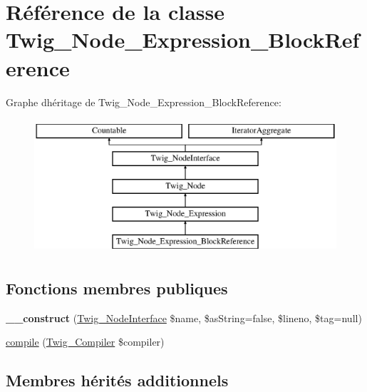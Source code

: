 \hypertarget{class_twig___node___expression___block_reference}{}\section{Référence de la classe Twig\+\_\+\+Node\+\_\+\+Expression\+\_\+\+Block\+Reference}
\label{class_twig___node___expression___block_reference}
Graphe d\textquotesingle{}héritage de Twig\+\_\+\+Node\+\_\+\+Expression\+\_\+\+Block\+Reference\+:\begin{figure}[H]
\begin{center}
\leavevmode
\includegraphics[height=5.000000cm]{class_twig___node___expression___block_reference}
\end{center}
\end{figure}
\subsection*{Fonctions membres publiques}
\begin{DoxyCompactItemize}
\item 
{\bfseries \+\_\+\+\_\+construct} (\hyperlink{interface_twig___node_interface}{Twig\+\_\+\+Node\+Interface} \$name, \$as\+String=false, \$lineno, \$tag=null)\hypertarget{class_twig___node___expression___block_reference_ad6e928c292a34c4a54a6a67003fe34b9}{}\label{class_twig___node___expression___block_reference_ad6e928c292a34c4a54a6a67003fe34b9}

\item 
\hyperlink{class_twig___node___expression___block_reference_a4e0faa87c3fae583620b84d3607085da}{compile} (\hyperlink{class_twig___compiler}{Twig\+\_\+\+Compiler} \$compiler)
\end{DoxyCompactItemize}
\subsection*{Membres hérités additionnels}


